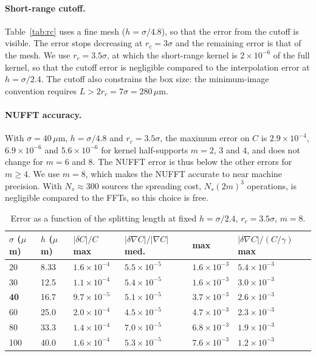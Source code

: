 \documentclass[11pt,a4paper]{article}
\newcommand{\um}{\,\mu\mathrm{m}}
\begin{document}
\paragraph{Short-range cutoff.} Table~\ref{tab:rc} uses a fine mesh ($h = \sigma/4.8$), so that the
error from the cutoff is visible. The error stops decreasing at $r_c = 3\sigma$ and the remaining
error is that of the mesh. We use $r_c = 3.5\sigma$, at which the short-range kernel is
$2\times10^{-6}$ of the full kernel, so that the cutoff error is negligible compared to the
interpolation error at $h = \sigma/2.4$. The cutoff also constrains the box size: the minimum-image
convention requires $L > 2r_c = 7\sigma = 280\um$.

\paragraph{NUFFT accuracy.} With $\sigma = 40\um$, $h = \sigma/4.8$ and $r_c = 3.5\sigma$, the
maximum error on $C$ is $2.9\times10^{-4}$, $6.9\times10^{-6}$ and $5.6\times10^{-6}$ for kernel
half-supports $m = 2$, $3$ and $4$, and does not change for $m = 6$ and $8$. The NUFFT error is thus
below the other errors for $m \ge 4$. We use $m = 8$, which makes the NUFFT accurate to near machine
precision. With $N_s \approx 300$ sources the spreading cost, $N_s(2m)^3$ operations, is negligible
compared to the FFTs, so this choice is free.

\begin{table}[h]
  \centering\small
  \begin{tabular}{llllll}
    \toprule
    $\sigma$ ($\mu$m) & $h$ ($\mu$m) & $|\delta C|/C$ max & $|\delta\nabla C|/|\nabla C|$ med. & max & $|\delta\nabla C|/(C/\gamma)$ max \\
    \midrule
    20 & 8.33 & $1.6\times10^{-4}$ & $5.5\times10^{-5}$ & $1.6\times10^{-3}$ & $5.4\times10^{-3}$ \\
    30 & 12.5 & $1.1\times10^{-4}$ & $5.4\times10^{-5}$ & $1.6\times10^{-3}$ & $3.0\times10^{-3}$ \\
    \textbf{40} & 16.7 & $9.7\times10^{-5}$ & $5.1\times10^{-5}$ & $3.7\times10^{-3}$ & $2.6\times10^{-3}$ \\
    60 & 25.0 & $2.0\times10^{-4}$ & $4.5\times10^{-5}$ & $4.7\times10^{-3}$ & $2.3\times10^{-3}$ \\
    80 & 33.3 & $1.4\times10^{-4}$ & $7.0\times10^{-5}$ & $6.8\times10^{-3}$ & $1.9\times10^{-3}$ \\
    100 & 40.0 & $1.6\times10^{-4}$ & $5.3\times10^{-5}$ & $7.6\times10^{-3}$ & $1.2\times10^{-3}$ \\
    \bottomrule
  \end{tabular}
  \caption{Error as a function of the splitting length at fixed $h = \sigma/2.4$, $r_c = 3.5\sigma$,
    $m = 8$.}
  \label{tab:sigma}
\end{table}
\end{document}

